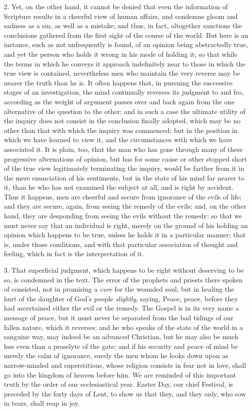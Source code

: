 2. Yet, on the other hand, it cannot be denied that even the
information of Scripture results in a cheerful view of human affairs,
and condemns gloom and sadness as a sin, as well as a mistake; and
thus, in fact, altogether sanctions the conclusions gathered from the
first sight of the course of the world. But here is an instance, such
as not unfrequently is found, of an opinion being abstractedly true,
and yet the person who holds it wrong in his mode of holding it; so
that while the terms in which he conveys it approach indefinitely near
to those in which the true view is contained, nevertheless men who
maintain the very reverse may be nearer the truth than he is. It often
happens that, in pursuing the successive stages of an investigation,
the mind continually reverses its judgment to and fro, according as
the weight of argument passes over and back again from the one
alternative of the question to the other; and in such a case the
ultimate utility of the inquiry does not consist in the conclusion
finally adopted, which may be no other than that with which the
inquiry was commenced; but in the position in which we have learned to
view it, and the circumstances with which we have associated it. It is
plain, too, that the man who has gone through many of these
progressive alternations of opinion, but has for some cause or other
stopped short of the true view legitimately terminating the inquiry,
would be farther from it in the mere enunciation of his sentiments,
but in the state of his mind far nearer to it, than he who has not
examined the subject at all, and is right by accident. Thus it
happens, men are cheerful and secure from ignorance of the evils of
life; and they are secure, again, from seeing the remedy of the evils;
and, on the other hand, they are desponding from seeing the evils
without the remedy: so that we must never say that an individual is
right, merely on the ground of his holding an opinion which happens to
be true, unless he holds it in a particular manner; that is, under
those conditions, and with that particular association of thought and
feeling, which in fact is the interpretation of it.

3. That superficial judgment, which happens to be right without
deserving to be so, is condemned in the text. The error of the
prophets and priests there spoken of consisted, not in promising a \emph{cure}
for the wounded soul, but in healing the hurt of the daughter of God's
people \emph{slightly}, saying, Peace, peace, before they had
ascertained either the evil or the remedy. The Gospel is in its very
name a message of peace, but it must never be separated from the bad
tidings of our fallen nature, which it reverses; and he who speaks of
the state of the world in a sanguine way, may indeed be an advanced
Christian, but he may also be much less even than a proselyte of the
gate; and if his security and peace of mind be merely the calm of
ignorance, surely the men whom he looks down upon as narrow-minded and
superstitious, whose religion consists in fear not in love, shall go
into the kingdom of heaven before him. We are reminded of this
important truth by the order of our ecclesiastical year. Easter Day,
our chief Festival, is preceded by the forty days of Lent, to show us
that they, and they only, who sow in tears, shall reap in joy.


